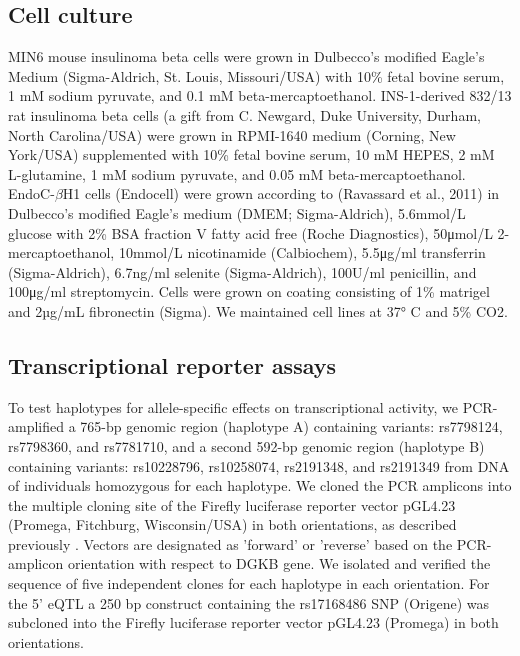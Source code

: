 \subsection{Cell culture}
MIN6 mouse insulinoma beta cells \cite{miyazakiEstablishmentPancreaticBeta1990} were grown in Dulbecco's modified Eagle's Medium (Sigma-Aldrich, St. Louis, Missouri/USA) with 10\% fetal bovine serum, 1 mM sodium pyruvate, and 0.1 mM beta-mercaptoethanol. INS-1-derived 832/13 rat insulinoma beta cells (a gift from C. Newgard, Duke University, Durham, North Carolina/USA) were grown in RPMI-1640 medium (Corning, New York/USA) supplemented with 10\% fetal bovine serum, 10 mM HEPES, 2 mM L-glutamine, 1 mM sodium pyruvate, and 0.05 mM beta-mercaptoethanol. EndoC-$\beta$H1 cells (Endocell) were grown according to (Ravassard et al., 2011) in Dulbecco's modified Eagle's medium (DMEM; Sigma-Aldrich), 5.6mmol/L glucose with 2\% BSA fraction V fatty acid free (Roche Diagnostics), 50μmol/L 2-mercaptoethanol, 10mmol/L nicotinamide (Calbiochem), 5.5μg/ml transferrin (Sigma-Aldrich), 6.7ng/ml selenite (Sigma-Aldrich), 100U/ml penicillin, and 100μg/ml streptomycin. Cells were grown on coating consisting of 1\% matrigel and 2µg/mL fibronectin (Sigma). We maintained cell lines at 37° C and 5\% CO2.

\subsection{Transcriptional reporter assays}
To test haplotypes for allele-specific effects on transcriptional activity, we PCR-amplified a 765-bp genomic region (haplotype A) containing variants: rs7798124, rs7798360, and rs7781710, and a second 592-bp genomic region (haplotype B) containing variants: rs10228796, rs10258074, rs2191348, and rs2191349 from DNA of individuals homozygous for each haplotype. We cloned the PCR amplicons into the multiple cloning site of the Firefly luciferase reporter vector pGL4.23 (Promega, Fitchburg, Wisconsin/USA) in both orientations, as described previously \cite{fogartyIdentificationRegulatoryVariant2014}. Vectors are designated as 'forward' or 'reverse' based on the PCR-amplicon orientation with respect to DGKB gene. We isolated and verified the sequence of five independent clones for each haplotype in each orientation. For the 5' eQTL a 250 bp construct containing the rs17168486 SNP (Origene) was subcloned into the Firefly luciferase reporter vector pGL4.23 (Promega) in both orientations. \\

